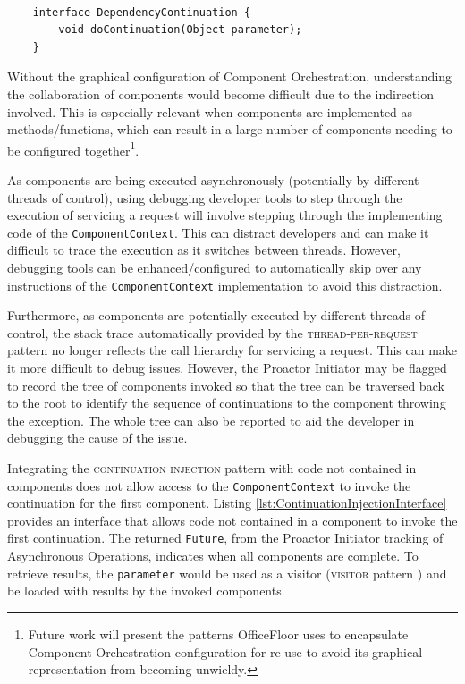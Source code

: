 \documentclass[prodmode]{style/acmlarge}
\begin{document}
\lstset{caption=Injected interface for a dependency to invoke a continuation (making the dependency an Active Object)}
\begin{lstlisting}[float,label=lst:DC_interface]

    interface DependencyContinuation {
        void doContinuation(Object parameter);
    }
\end{lstlisting}

Without the graphical configuration of Component Orchestration, understanding
the collaboration of components would become difficult due to the indirection
involved.  This is especially relevant when components are implemented as
methods/functions, which can result in a large number of components needing to
be configured together\footnote{Future work will present the patterns
OfficeFloor \cite{officefloor} uses to encapsulate Component Orchestration
configuration for re-use to avoid its graphical representation from becoming
unwieldy.}.

As components are being executed asynchronously (potentially by different
threads of control), using debugging developer tools to step through the
execution of servicing a request will involve stepping through the implementing
code of the \texttt{ComponentContext}.  This can distract developers and can
make it difficult to trace the execution as it switches between threads. 
However, debugging tools can be enhanced/configured to automatically skip over any
instructions of the \texttt{ComponentContext} implementation to avoid this
distraction.

Furthermore, as components are potentially executed by different threads of
control, the stack trace automatically provided by the
\textsc{thread-per-request} pattern no longer reflects the call hierarchy for
servicing a request.  This can make it more difficult to debug issues.  However,
the Proactor Initiator may be flagged to record the tree of components invoked
so that the tree can be traversed back to the root to identify the sequence of
continuations to the component throwing the exception.  The whole tree can also
be reported to aid the developer in debugging the cause of the issue.

Integrating the \textsc{continuation injection} pattern with code not contained
in components does not allow access to the \texttt{ComponentContext} to invoke
the continuation for the first component.  Listing
\ref{lst:ContinuationInjectionInterface} provides an interface that allows code
not contained in a component to invoke the first continuation.  The returned
\texttt{Future}, from the Proactor Initiator tracking of Asynchronous
Operations, indicates when all components are complete.  To retrieve results,
the \texttt{parameter} would be used as a visitor (\textsc{visitor} pattern
\cite{gof}) and be loaded with results by the invoked components.
\end{document}
